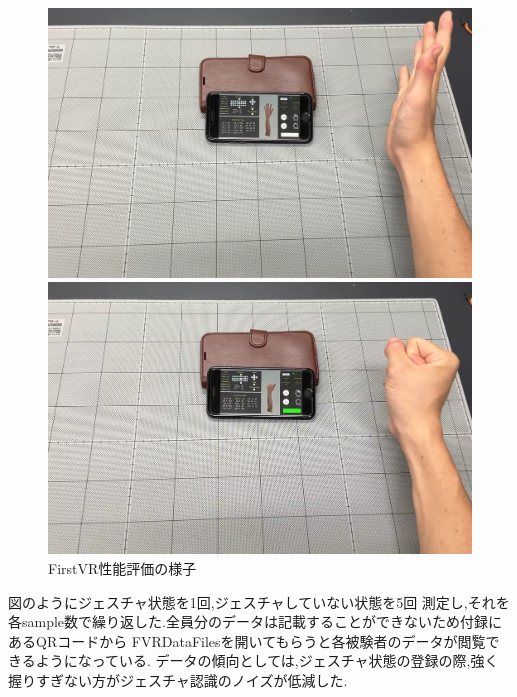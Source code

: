 \documentclass{ltjsreport}
\begin{document}
		\begin{figure}[H]
		\centering
		\begin{minipage}{0.45\columnwidth}
		\centering
		\includegraphics[width = \columnwidth]{../figs/IMG_5200.PNG}
		\end{minipage}
		\hspace{0.04\columnwidth}
		\begin{minipage}{0.45\columnwidth}
		\centering
		\includegraphics[width = \columnwidth]{../figs/IMG_5201.PNG}
		\end{minipage}
		\caption{FirstVR性能評価の様子}
		\label{fig:FirstVRevaluation}
		\end{figure}
		
		図のようにジェスチャ状態を1回,ジェスチャしていない状態を5回
		測定し,それを各sample数で繰り返した.全員分のデータは記載することができないため付録にあるQRコードから
		FVRDataFilesを開いてもらうと各被験者のデータが閲覧できるようになっている.
		データの傾向としては,ジェスチャ状態の登録の際,強く握りすぎない方がジェスチャ認識のノイズが低減した.
\end{document}

